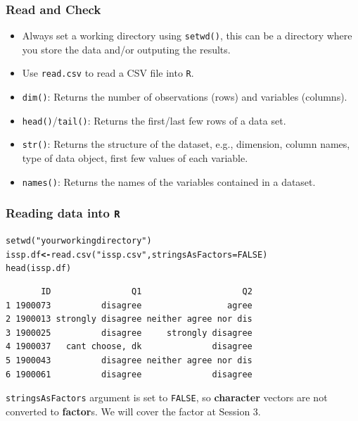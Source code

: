 \documentclass[handout]{beamer}\usepackage[]{graphicx}\usepackage[]{color}
\makeatletter
\newcommand{\hlnum}[1]{\textcolor[rgb]{0.533,0,0.133}{#1}}%
\newcommand{\hlstr}[1]{\textcolor[rgb]{0.667,0.267,0}{#1}}%
\newcommand{\hlstd}[1]{\textcolor[rgb]{0,0,0}{#1}}%
\newcommand{\hlkwb}[1]{\textcolor[rgb]{0,0,0.4}{\textbf{#1}}}%
\newcommand{\hlkwc}[1]{\textcolor[rgb]{0,0,0.4}{#1}}%
\newcommand{\hlkwd}[1]{\textcolor[rgb]{0,0.267,0.4}{#1}}%
\newenvironment{kframe}{%
 \def\at@end@of@kframe{}%
 \ifinner\ifhmode%
  \def\at@end@of@kframe{\end{minipage}}%
  \begin{minipage}{\columnwidth}%
 \fi\fi%
 \def\FrameCommand##1{\hskip\@totalleftmargin \hskip-\fboxsep
 \colorbox{shadecolor}{##1}\hskip-\fboxsep
     \hskip-\linewidth \hskip-\@totalleftmargin \hskip\columnwidth}%
 \MakeFramed {\advance\hsize-\width
   \@totalleftmargin\z@ \linewidth\hsize
   \@setminipage}}%
 {\par\unskip\endMakeFramed%
 \at@end@of@kframe}
\newenvironment{knitrout}{}{} %
\makeatother
\begin{document}
\begin{frame}[fragile]
\frametitle{Read and Check}
  \begin{itemize}
  \item Always set a working directory using \texttt{setwd()}, this can be a directory where you store the data and/or outputing the results.  
  \item Use \texttt{read.csv} to read a CSV file into \texttt{R}.
  \item \texttt{dim()}: Returns the number of observations (rows) and variables (columns).
  \item \texttt{head()}/\texttt{tail()}: Returns the first/last few rows of a data set.
  \item \texttt{str()}: Returns the structure of the dataset, e.g., dimension, column names, type of data object, first few values of each variable.
  \item \texttt{names()}: Returns the names of the variables contained in a dataset.
  \end{itemize}
\end{frame}


\begin{frame}[fragile]
\frametitle{Reading data into \texttt{R}}
\begin{knitrout}
\color{fgcolor}\begin{kframe}
\begin{alltt}
\hlkwd{setwd}\hlstd{(}\hlstr{"your working directory"}\hlstd{)}
\hlstd{issp.df} \hlkwb{<-} \hlkwd{read.csv}\hlstd{(}\hlstr{"issp.csv"}\hlstd{,} \hlkwc{stringsAsFactors} \hlstd{=} \hlnum{FALSE}\hlstd{)}
\hlkwd{head}\hlstd{(issp.df)}
\end{alltt}
\end{kframe}
\end{knitrout}
\begin{knitrout}
\color{fgcolor}\begin{kframe}
\begin{verbatim}
       ID                Q1                    Q2
1 1900073          disagree                 agree
2 1900013 strongly disagree neither agree nor dis
3 1900025          disagree     strongly disagree
4 1900037   cant choose, dk              disagree
5 1900043          disagree neither agree nor dis
6 1900061          disagree              disagree
\end{verbatim}
\end{kframe}
\end{knitrout}
\texttt{stringsAsFactors} argument is set to \texttt{FALSE}, so \textbf{character} vectors are not converted to \textbf{factor}s. We will cover the factor at Session 3. 
\end{frame}
\end{document}
